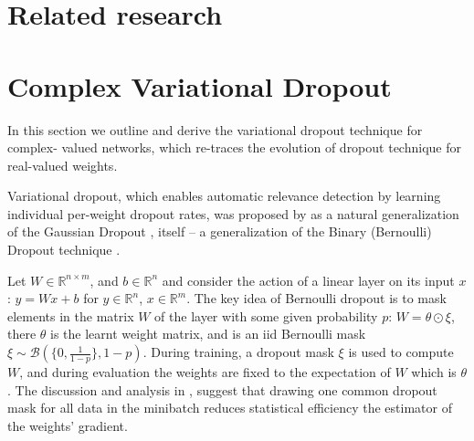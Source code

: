 \documentclass[a4paper,10pt]{article}
\newcommand{\real}{\mathbb{R}}
\begin{document}


\section{Related research} %
\label{sec:realted_research}



\section{Complex Variational Dropout} %
\label{sec:complex_varaitional_dropout}

In this section we outline and derive the variational dropout technique for complex-%
valued networks, which re-traces the evolution of dropout technique for real-valued
weights.

Variational dropout, which enables automatic relevance detection by learning individual
per-weight dropout rates, was proposed by \cite{kingma_variational_2015} as a natural
generalization of the Gaussian Dropout \cite{srivastava_dropout_2014,wang_fast_2013},
itself -- a generalization of the Binary (Bernoulli) Dropout technique \cite{hinton_improving_2012}.

Let $W \in\real^{n\times m}$, and $b\in \real^n$ and consider the action of a linear
layer on its input $x$: $y = W x + b$ for $y\in \real^n$, $x\in \real^m$. The key idea
of Bernoulli dropout is to mask elements in the matrix $W$ of the layer with some given
probability $p$: $W = \theta \odot \xi$, there $\theta$ is the learnt weight matrix,
and is an iid Bernoulli mask $\xi \sim \mathcal{B}(\{0, \tfrac1{1-p}\}, 1-p)$. During
training, a dropout mask $\xi$ is used to compute $W$, and during evaluation the weights
are fixed to the expectation of $W$ which is $\theta$. The discussion and analysis in
\cite{kingma_variational_2015}, suggest that drawing one common dropout mask for all
data in the minibatch reduces statistical efficiency the estimator of the weights'
gradient.
\end{document}
